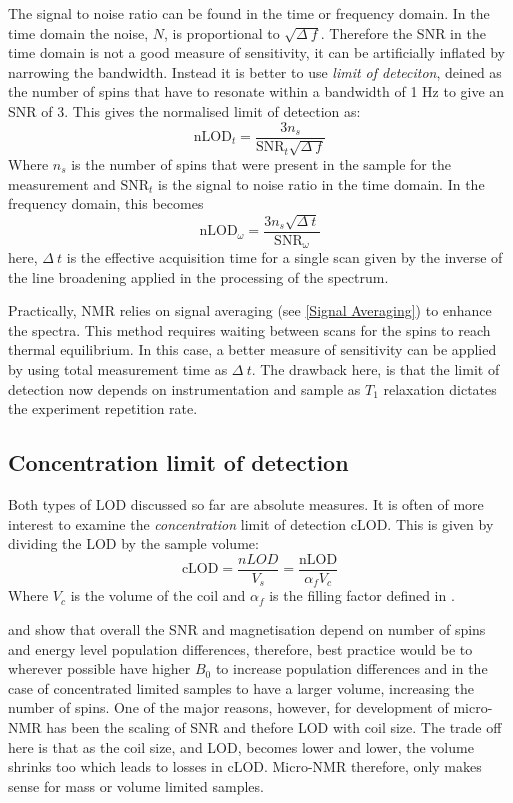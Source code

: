 The signal to noise ratio can be found in the time or frequency domain. In the time domain the noise, $N$, is proportional to
$\sqrt{\Delta~f}$. Therefore the SNR in the time domain is not a good measure of sensitivity, it can be
artificially inflated by narrowing the bandwidth. Instead it is better to use \textit{limit of deteciton}, deined as
the number of spins that have to resonate within a bandwidth of 1 Hz to give an SNR of 3. This gives
the normalised limit of detection as\citep{Badilita:2011td}:
\begin{equation}
  \text{nLOD}_{t} = \frac{3n_s}{\text{SNR}_{t}\sqrt{\Delta~f}}
\end{equation}
Where $n_s$ is the number of spins that were present in the sample for the measurement and $\text{SNR}_t$ is the
signal to noise ratio in the time domain.
In the frequency domain, this becomes
\begin{equation}\label{eqn:nLOD}
  \text{nLOD}_\omega = \frac{3n_s\sqrt{\Delta~t}}{\text{SNR}_\omega}
\end{equation}
here, $\Delta~t$ is the effective acquisition time for a single scan given by the inverse of the
line broadening applied in the processing of the spectrum.

Practically, NMR relies on signal averaging (see \ref{Signal Averaging}) to enhance the spectra. This
method requires waiting between scans for the spins to reach thermal equilibrium. In
this case, a better measure of sensitivity can be applied by using total measurement time
as $\Delta~t$. The drawback here, is that the limit of detection now depends on instrumentation
and sample as $T_1$ relaxation dictates the experiment repetition rate.

\subsection{Concentration limit of detection}

Both types of LOD discussed so far are absolute measures. It is often of more
interest to examine the \textit{concentration} limit of detection cLOD. This is given by
dividing the LOD by the sample volume:
\begin{equation}\label{eqn:cLOD}
  \text{cLOD} = \frac{nLOD}{V_s} = \frac{\text{nLOD}}{\alpha_fV_c}
\end{equation}
Where $V_c$ is the volume of the coil and $\alpha_f$ is the filling factor defined in .

 and  show that overall the SNR and
magnetisation depend on number of spins and energy level population differences, therefore, best practice
would be to wherever possible have higher $B_0$ to increase population differences and in the case of
concentrated limited samples to have a larger volume, increasing the number of spins.
One of the major reasons, however, for development of micro-NMR has been the scaling of SNR and thefore LOD
with coil size. The trade off here is that as the coil size, and LOD, becomes lower and lower, the
volume shrinks too which leads to losses in cLOD. Micro-NMR therefore, only makes sense for mass
or volume limited samples.


